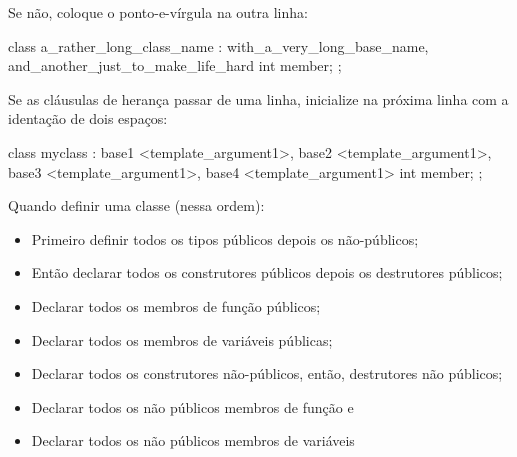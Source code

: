 \documentclass{article}
\begin{document}
\begin{code}
class myclass : base {
\end{code}

Se não, coloque o ponto-e-vírgula na outra linha:

\begin{code}
class a_rather_long_class_name 
: with_a_very_long_base_name, and_another_just_to_make_life_hard
{ 
  int member; 
};
\end{code}

Se as cláusulas de herança passar de uma linha, inicialize na próxima linha com a identação de dois espaços:
\begin{code}
class myclass 
: base1 <template_argument1>, base2 <template_argument1>,
  base3 <template_argument1>, base4 <template_argument1>
{ 
  int member; 
};
\end{code}

Quando definir uma classe (nessa ordem):

\begin{itemize}
\item Primeiro definir todos os tipos públicos depois os não-públicos;
\item Então declarar todos os construtores públicos depois os destrutores públicos;
\item Declarar todos os membros de função públicos;
\item Declarar todos os membros de variáveis públicas;
\item Declarar todos os construtores não-públicos, então, destrutores não públicos;
\item Declarar todos os não públicos membros de função e
\item Declarar todos os não públicos membros de variáveis
\end{itemize}



\end{document}
